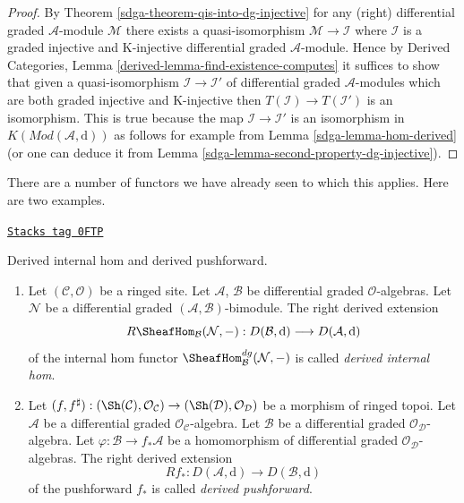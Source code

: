 \begin{proof}

By Theorem \ref{sdga-theorem-qis-into-dg-injective}
for any (right) differential graded $\mathcal{A}$-module
$\mathcal{M}$ there exists a quasi-isomorphism
$\mathcal{M} \to \mathcal{I}$ where $\mathcal{I}$
is a graded injective and K-injective
differential graded $\mathcal{A}$-module.
Hence by Derived Categories, Lemma \ref{derived-lemma-find-existence-computes}
it suffices to show that given a quasi-isomorphism
$\mathcal{I} \to \mathcal{I}'$ of differential graded
$\mathcal{A}$-modules which are both
graded injective and K-injective
then $T(\mathcal{I}) \to T(\mathcal{I}')$ is an isomorphism.
This is true because the map $\mathcal{I} \to \mathcal{I}'$
is an isomorphism in $K(\textit{Mod}(\mathcal{A}, \text{d}))$ as follows
for example from Lemma \ref{sdga-lemma-hom-derived} (or one can
deduce it from Lemma \ref{sdga-lemma-second-property-dg-injective}).
\end{proof}

There are a number of functors we have already seen to which this applies.
Here are two examples.

\begin{definition}[Pushforward]
\label{sdga-definition-pushforward}
\href{https://stacks.math.columbia.edu/tag/0FTP}{\texttt{Stacks tag 0FTP}}

Derived internal hom and derived pushforward.
\begin{enumerate}
\item Let $(\mathcal{C}, \mathcal{O})$ be a ringed site. Let
$\mathcal{A}$, $\mathcal{B}$ be differential graded $\mathcal{O}$-algebras.
Let $\mathcal{N}$ be a  differential graded
$(\mathcal{A}, \mathcal{B})$-bimodule. The right derived extension
$$
R\SheafHom_\mathcal{B}(\mathcal{N}, -) :
D(\mathcal{B}, \text{d})
\longrightarrow
D(\mathcal{A}, \text{d})
$$
of the internal hom functor $\SheafHom_\mathcal{B}^{dg}(\mathcal{N}, -)$
is called {\it derived internal hom}.
\item Let $(f, f^\sharp) : (\Sh(\mathcal{C}), \mathcal{O}_\mathcal{C})
\to (\Sh(\mathcal{D}), \mathcal{O}_\mathcal{D})$
be a morphism of ringed topoi. Let $\mathcal{A}$ be a differential
graded $\mathcal{O}_\mathcal{C}$-algebra. Let $\mathcal{B}$ be a
differential graded $\mathcal{O}_\mathcal{D}$-algebra. Let
$\varphi : \mathcal{B} \to f_*\mathcal{A}$ be a homomorphism
of differential graded $\mathcal{O}_\mathcal{D}$-algebras.
The right derived extension
$$
Rf_* :
D(\mathcal{A}, \text{d})
\longrightarrow
D(\mathcal{B}, \text{d})
$$
of the pushforward $f_*$ is called {\it derived pushforward}.
\end{enumerate}
\end{definition}

